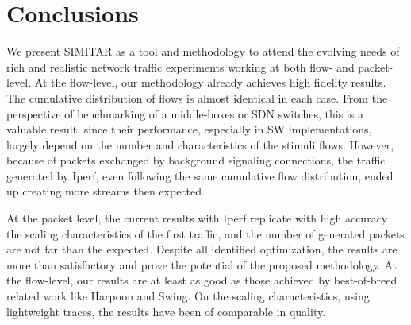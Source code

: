 \section{Conclusions}


We present SIMITAR as a tool and methodology to attend the evolving needs of rich and realistic network traffic experiments working at both flow-  and packet-level. At the flow-level, our methodology already achieves high fidelity results. The cumulative distribution of flows is almost identical in each case. From the perspective of benchmarking of a middle-boxes or SDN switches, this is a valuable result, since their performance, especially in SW implementations, largely depend on the number and characteristics of the stimuli flows. However, because of packets exchanged by background signaling connections, the traffic generated by Iperf, even following the same cumulative flow distribution, ended up creating more streams then expected.  

At the packet level, the current results with Iperf replicate with high accuracy the scaling characteristics of the first traffic, and the number of generated packets are not far than the expected.  Despite all identified optimization, the results are more than satisfactory and prove the potential of the proposed methodology. At the flow-level, our results are at least as good as those achieved by best-of-breed related work like Harpoon and Swing.  On the scaling characteristics, using lightweight traces, the results have been of comparable in quality.
